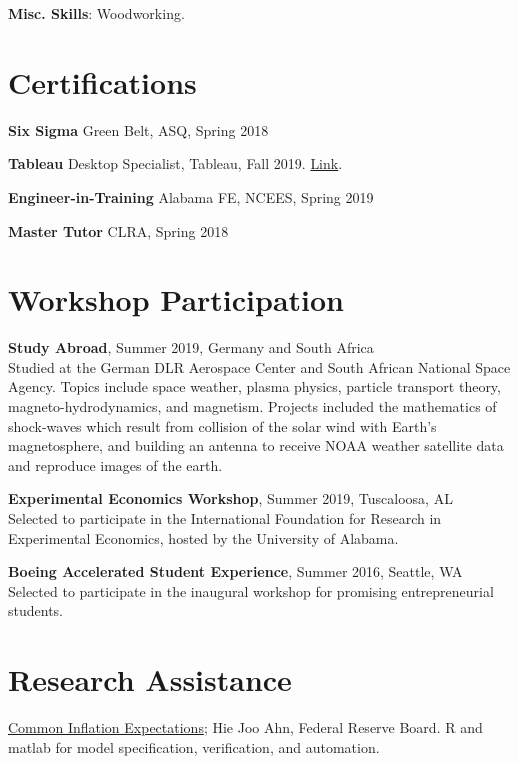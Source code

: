 \documentclass[margin,line]{res}
\begin{document}
\begin{resume}
{\bf Misc. Skills}: Woodworking. 

\vspace{.75cm}
\section{\sc Certifications}
{\bf Six Sigma} Green Belt, ASQ, Spring 2018
\vspace*{-3mm}

{\bf Tableau} Desktop Specialist, Tableau, Fall 2019. \href{https://www.credly.com/badges/e9a605a8-1977-4a1c-ab24-149a37c7fb36/linked_in_profile}{Link}.
\vspace*{-3mm}

{\bf Engineer-in-Training} Alabama FE, NCEES, Spring 2019
\vspace*{-3mm}

{\bf Master Tutor} CLRA, Spring 2018
\vspace*{-3mm}

\vspace{.75cm}
\section{\sc Workshop Participation}
    {\bf Study Abroad}, Summer 2019, Germany and South Africa\\
    {Studied at the German DLR Aerospace Center and South African National Space Agency. Topics include space weather, plasma physics, particle transport theory, magneto-hydrodynamics, and magnetism. Projects included the mathematics of shock-waves which result from collision of the solar wind with Earth's magnetosphere, and building an antenna to receive NOAA weather satellite data and reproduce images of the earth.}
    
    {\bf Experimental Economics Workshop}, Summer 2019, Tuscaloosa, AL\\
    {Selected to participate in the International Foundation for Research in Experimental Economics, hosted by the University of Alabama.}
    
    {\bf Boeing Accelerated Student Experience}, Summer 2016, Seattle, WA\\
    {Selected to participate in the inaugural workshop for promising entrepreneurial students.}

\vspace{.75cm}
\section{\sc Research Assistance}
  \href{https://www.federalreserve.gov/econres/notes/feds-notes/research-data-series-index-of-common-inflation-expectations-20210305.htm}{Common Inflation Expectations}; Hie Joo Ahn, Federal Reserve Board. R and matlab for model specification, verification, and automation. 


\end{resume}
\end{document}
